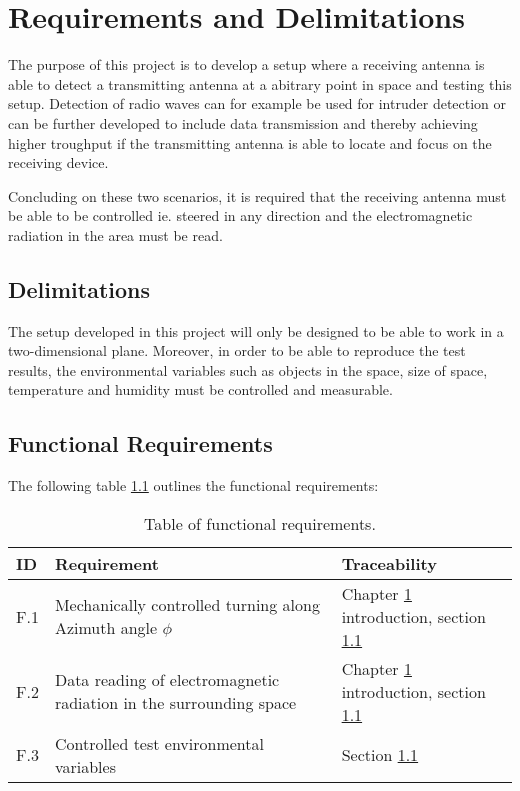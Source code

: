 \chapter{Requirements and Delimitations} \label{ch:req}
The purpose of this project is to develop a setup where a receiving antenna is able to detect a transmitting antenna at a abitrary point in space and testing this setup. Detection of radio waves can for example be used for intruder detection or can be further developed to include data transmission and thereby achieving higher troughput if the transmitting antenna is able to locate and focus on the receiving device. 

Concluding on these two scenarios, it is required that the receiving antenna must be able to be controlled ie. steered in any direction and the electromagnetic radiation in the area must be read. 

\section{Delimitations} \label{sec:delimitations}
The setup developed in this project will only be designed to be able to work in a two-dimensional plane. Moreover, in order to be able to reproduce the test results, the environmental variables such as objects in the space, size of space, temperature and humidity must be controlled and measurable. 

\section{Functional Requirements}
The following table \ref{tab:func_req} outlines the functional requirements:
\begin{table}[H]
    \centering
    \begin{tabular}{p{}|>{\raggedright}p{}|p{}}
        \textbf{ID} & \textbf{Requirement} & \textbf{Traceability} \\
        \hline
        \hline
        F.1 & Mechanically controlled turning along Azimuth angle $\phi$ & Chapter \ref{ch:req} introduction, section \ref{sec:delimitations} \\
        F.2 & Data reading of electromagnetic radiation in the surrounding space & Chapter \ref{ch:req} introduction, section \ref{sec:delimitations} \\
        F.3 & Controlled test environmental variables & Section \ref{sec:delimitations} \\
    \end{tabular}
    \caption{Table of functional requirements.}
    \label{tab:func_req}
\end{table}

